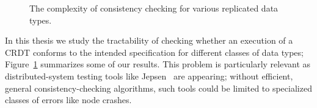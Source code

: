 

\begin{figure}[t]
  \centering
  
  \caption{The complexity of consistency checking for various replicated data types. 
  }
  \label{fig:results}
\end{figure}

In this thesis we study the tractability of checking whether an execution of a CRDT conforms to the intended specification for different classes of data types; Figure~\ref{fig:results} summarizes some of our results. This problem is particularly relevant as distributed-system testing tools like Jepsen~\cite{MISC:Jepsen} are appearing; without efficient, general consistency-checking algorithms, such tools could be limited to specialized classes of errors like node crashes. 

